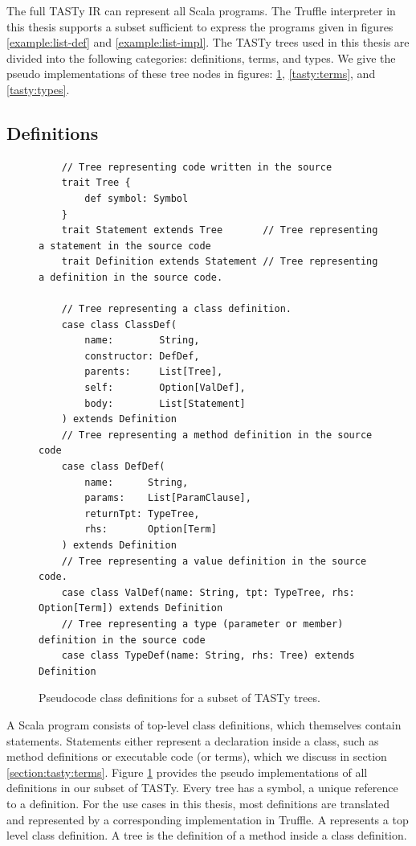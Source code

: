The full TASTy IR can represent all Scala programs.
The Truffle interpreter in this thesis supports a subset sufficient to express the programs given in figures \ref{example:list-def} and \ref{example:list-impl}.
The TASTy trees used in this thesis are divided into the following categories: definitions, terms, and types. 
We give the pseudo implementations of these tree nodes in figures: \ref{tasty:defs}, \ref{tasty:terms}, and \ref{tasty:types}.

\subsection{Definitions}

\begin{figure}[!htb]
	\begin{verbatim}
	// Tree representing code written in the source
	trait Tree {
		def symbol: Symbol
	}                         
	trait Statement extends Tree       // Tree representing a statement in the source code
	trait Definition extends Statement // Tree representing a definition in the source code.
		
	// Tree representing a class definition.
	case class ClassDef(
		name:        String,
		constructor: DefDef, 
		parents:     List[Tree], 
		self:        Option[ValDef], 
		body:        List[Statement]
	) extends Definition
	// Tree representing a method definition in the source code
	case class DefDef(
		name:      String, 
		params:    List[ParamClause], 
		returnTpt: TypeTree, 
		rhs:       Option[Term]
	) extends Definition
	// Tree representing a value definition in the source code.
	case class ValDef(name: String, tpt: TypeTree, rhs: Option[Term]) extends Definition
	// Tree representing a type (parameter or member) definition in the source code
	case class TypeDef(name: String, rhs: Tree) extends Definition
	\end{verbatim} 
	\caption{Pseudocode class definitions for a subset of TASTy trees.}
	\label{tasty:defs}
\end{figure}

A Scala program consists of top-level class definitions, which themselves contain statements.
Statements either represent a declaration inside a class, such as method definitions or executable code (or terms), which we discuss in section \ref{section:tasty:terms}.
Figure \ref{tasty:defs} provides the pseudo implementations of all definitions in our subset of TASTy.
Every tree has a symbol, a unique reference to a definition.
For the use cases in this thesis, most definitions are translated and represented by a corresponding implementation in Truffle.
A  represents a top level class definition.
A  tree is the definition of a method inside a class definition.

